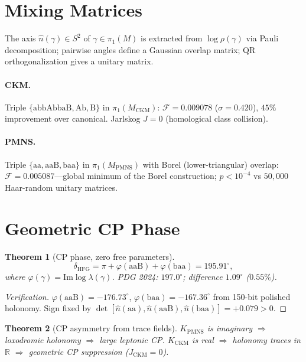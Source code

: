 \documentclass[11pt,a4paper]{article}
\newtheorem{theorem}{Theorem}
\theoremstyle{definition}
\theoremstyle{remark}
\newcommand{\MPMNS}{M_{\mathrm{PMNS}}}
\newcommand{\MCKM}{M_{\mathrm{CKM}}}
\newcommand{\KPMNS}{K_{\mathrm{PMNS}}}
\newcommand{\KCKM}{K_{\mathrm{CKM}}}
\begin{document}
\section{Mixing Matrices}
\label{sec:mixing}

The axis $\hat{n}(\gamma)\in S^2$ of $\gamma\in\pi_1(M)$ is extracted
from $\log\rho(\gamma)$ via Pauli decomposition; pairwise angles define
a Gaussian overlap matrix; QR orthogonalization gives a unitary matrix.

\paragraph{CKM.}
Triple $\{\mathrm{abbAbbaB},\mathrm{Ab},\mathrm{B}\}$ in $\pi_1(\MCKM)$:
$\mathcal{F}=0.009078$ ($\sigma=0.420$), $45\%$ improvement over
canonical. Jarlskog $J=0$ (homological class collision).

\paragraph{PMNS.}
Triple $\{\mathrm{aa},\mathrm{aaB},\mathrm{baa}\}$ in $\pi_1(\MPMNS)$
with Borel (lower-triangular) overlap:
$\mathcal{F}=0.005087$---global minimum of the Borel construction;
$p<10^{-4}$ vs $50{,}000$ Haar-random unitary matrices.

\section{Geometric CP Phase}
\label{sec:cp}

\begin{theorem}[CP phase, zero free parameters]
\label{thm:cp}
\[
  \delta_{\mathrm{HFG}}
  = \pi + \varphi(\mathrm{aaB}) + \varphi(\mathrm{baa})
  = 195.91^\circ,
\]
where $\varphi(\gamma)=\mathrm{Im}\log\lambda(\gamma)$.
PDG 2024: $197.0^\circ$; difference $1.09^\circ$ ($0.55\%$).
\end{theorem}

\begin{proof}[Verification]
$\varphi(\mathrm{aaB})=-176.73^\circ$,
$\varphi(\mathrm{baa})=-167.36^\circ$ from 150-bit polished holonomy.
Sign fixed by $\det[\hat n(\mathrm{aa}),\hat n(\mathrm{aaB}),
\hat n(\mathrm{baa})]=+0.079>0$.
\end{proof}

\begin{theorem}[CP asymmetry from trace fields]
\label{thm:cp_asym}
$\KPMNS$ is imaginary $\Rightarrow$ loxodromic holonomy $\Rightarrow$
large leptonic CP.
$\KCKM$ is real $\Rightarrow$ holonomy traces in $\mathbb{R}$
$\Rightarrow$ geometric CP suppression ($J_\mathrm{CKM}=0$).
\end{theorem}
\end{document}
